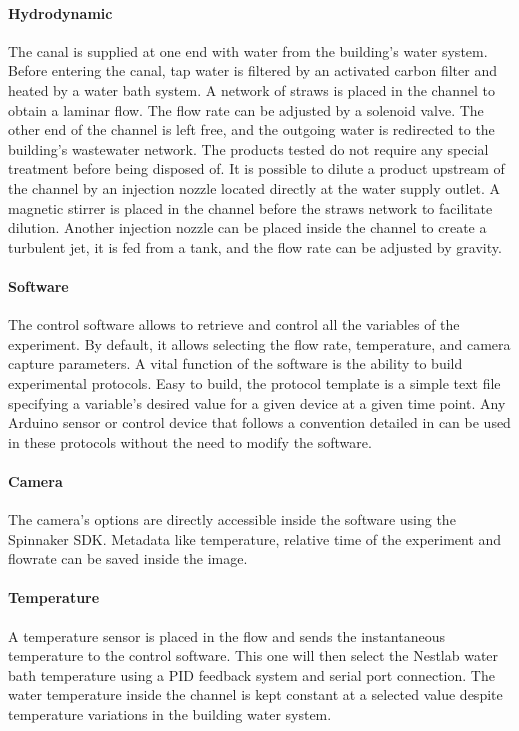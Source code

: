   \paragraph{Hydrodynamic}
  The canal is supplied at one end with water from the building's water system. Before entering the canal, tap water is filtered by an activated carbon filter and heated by a water bath system. A network of straws is placed in the channel to obtain a laminar flow. The flow rate can be adjusted by a solenoid valve. The other end of the channel is left free, and the outgoing water is redirected to the building's wastewater network. The products tested do not require any special treatment before being disposed of. It is possible to dilute a product upstream of the channel by an injection nozzle located directly at the water supply outlet. A magnetic stirrer is placed in the channel before the straws network to facilitate dilution. Another injection nozzle can be placed inside the channel to create a turbulent jet, it is fed from a tank, and the flow rate can be adjusted by gravity.

  \paragraph{Software}
  The control software allows to retrieve and control all the variables of the experiment. By default, it allows selecting the flow rate, temperature, and camera capture parameters. A vital function of the software is the ability to build experimental protocols. Easy to build, the protocol template is a simple text file specifying a variable's desired value for a given device at a given time point. Any Arduino sensor or control device that follows a convention detailed in \url{} can be used in these protocols without the need to modify the software.

  \paragraph{Camera}
  The camera's options are directly accessible inside the software using the Spinnaker SDK. Metadata like temperature, relative time of the experiment and flowrate can be saved inside the image.

  \paragraph{Temperature}
  A temperature sensor is placed in the flow and sends the instantaneous temperature to the control software. This one will then select the Nestlab water bath temperature using a PID feedback system and serial port connection. The water temperature inside the channel is kept constant at a selected value despite temperature variations in the building water system.

